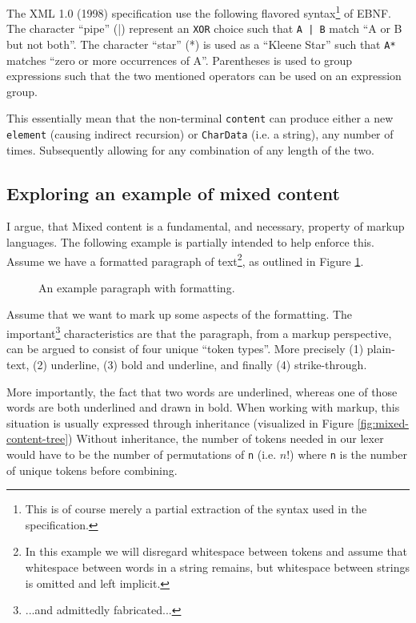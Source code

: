 \documentclass{scrreprt}
\begin{document}
The XML 1.0 (1998) specification use the following flavored syntax\footnote{This is of course merely a partial extraction of the syntax used in the specification.} of EBNF. The character ``pipe'' (|) represent an \texttt{XOR} choice such that \texttt{A | B} match ``A or B but not both''. The character ``star'' (*) is used as a ``Kleene Star'' such that \texttt{A*} matches ``zero or more occurrences of A''. Parentheses is used to group expressions such that the two mentioned operators can be used on an expression group.

This essentially mean that the non-terminal \texttt{content} can produce either a new \texttt{element} (causing indirect recursion) or \texttt{CharData} (i.e. a string), any number of times. Subsequently allowing for any combination of any length of the two.



\subsection{Exploring an example of mixed content}
I argue, that Mixed content is a fundamental, and necessary, property of markup languages. The following example is partially intended to help enforce this. Assume we have a formatted paragraph of text\footnote{In this example we will disregard whitespace between tokens and assume that whitespace between words in a string remains, but whitespace between strings is omitted and left implicit.}, as outlined in Figure \ref{fig:mixed-content-paragraph}.


\begin{figure}[h]
\centering
{}
\caption{An example paragraph with formatting.}
\label{fig:mixed-content-paragraph}
\end{figure}


Assume that we want to mark up some aspects of the formatting. The important\footnote{...and admittedly fabricated...} characteristics are that the paragraph, from a markup perspective, can be argued to consist of four unique ``token types''. More precisely (1) plain-text, (2) underline, (3) bold and underline, and finally (4) strike-through.


More importantly, the fact that two words are underlined, whereas one of those words are both underlined and drawn in bold. When working with markup, this situation is usually expressed through inheritance (visualized in Figure \ref{fig:mixed-content-tree}) Without inheritance, the number of tokens needed in our lexer would have to be the number of permutations of \texttt{n} (i.e. \(n!\)) where \texttt{n} is the number of unique tokens before combining.
\end{document}
